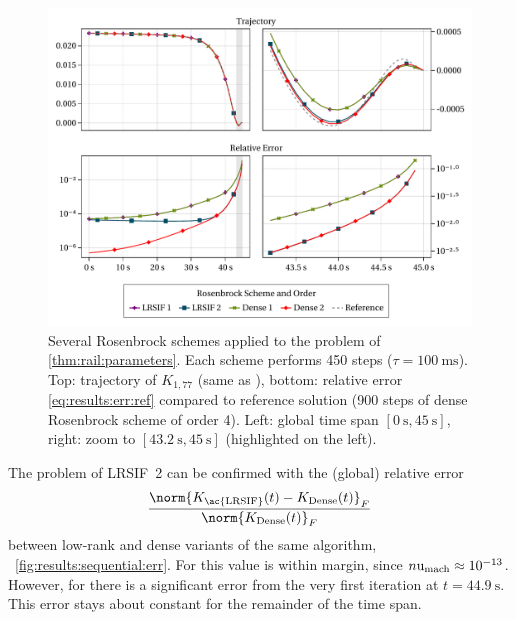 \begin{figure}[tp]
  \includegraphics[width=\textwidth]{figures/fig_results_sequential.pdf}
  \caption[Rosenbrock method applied to Rail problem]{%
    Several Rosenbrock schemes applied to the problem of \autoref{thm:rail:parameters}.
    Each scheme performs 450 steps ($\tau = \SI{100}{\milli\second}$).
    Top: trajectory of $K_{1,77}$ (same as \cite[Fig.~1]{Lang2015}),
    bottom: relative error \eqref{eq:results:err:ref} compared to reference solution
    (900 steps of dense Rosenbrock scheme of order 4).
    Left: global time span $[\SI{0}{\second}, \SI{45}{\second}]$,
    right: zoom to $[\SI[round-mode=off]{43.2}{\second}, \SI{45}{\second}]$ (highlighted on the left).
  }
  \label{fig:results:sequential:rail}
\end{figure}

The problem of \ac{LRSIF}~2 can be confirmed with the (global) relative error
\begin{equation}
\label{eq:results:err:lr_v_dense}
  \frac{\norm{K_\text{\ac{LRSIF}}(t) - K_\text{Dense}(t)}_F}{\norm{K_\text{Dense}(t)}_F}
\end{equation}
between low-rank and dense variants of the same algorithm,
\cf~\autoref{fig:results:sequential:err}.
For  this value is within margin,
since $n \mathrm u_\text{mach} \approx 10^{-13}$.
However, for  there is a significant error from the very first iteration at $t=\SI[round-precision=1]{44.9}{\second}$.
This error stays about constant for the remainder of the time span.


